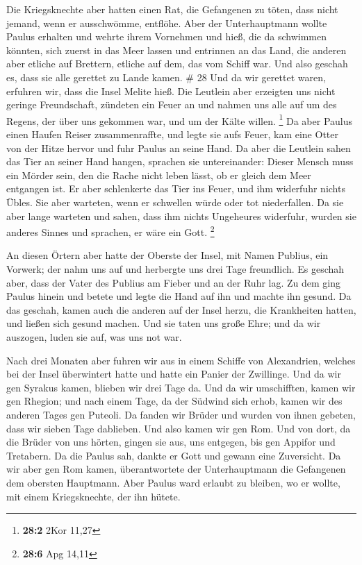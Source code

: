  Die Kriegsknechte aber hatten einen Rat, die Gefangenen zu
töten, dass nicht jemand, wenn er ausschwömme, entflöhe. 
Aber der Unterhauptmann wollte Paulus erhalten und wehrte ihrem
Vornehmen und hieß, die da schwimmen könnten, sich zuerst in das Meer
lassen und entrinnen an das Land,  die anderen aber etliche
auf Brettern, etliche auf dem, das vom Schiff war. Und also geschah es,
dass sie alle gerettet zu Lande kamen. \# 28  Und da wir
gerettet waren, erfuhren wir, dass die Insel Melite hieß. 
Die Leutlein aber erzeigten uns nicht geringe Freundschaft, zündeten ein
Feuer an und nahmen uns alle auf um des Regens, der über uns gekommen
war, und um der Kälte willen. \footnote{\textbf{28:2} 2Kor 11,27}
 Da aber Paulus einen Haufen Reiser zusammenraffte, und
legte sie aufs Feuer, kam eine Otter von der Hitze hervor und fuhr
Paulus an seine Hand.  Da aber die Leutlein sahen das Tier
an seiner Hand hangen, sprachen sie untereinander: Dieser Mensch muss
ein Mörder sein, den die Rache nicht leben lässt, ob er gleich dem Meer
entgangen ist.  Er aber schlenkerte das Tier ins Feuer, und
ihm widerfuhr nichts Übles.  Sie aber warteten, wenn er
schwellen würde oder tot niederfallen. Da sie aber lange warteten und
sahen, dass ihm nichts Ungeheures widerfuhr, wurden sie anderes Sinnes
und sprachen, er wäre ein Gott. \footnote{\textbf{28:6} Apg 14,11}

 An diesen Örtern aber hatte der Oberste der Insel, mit
Namen Publius, ein Vorwerk; der nahm uns auf und herbergte uns drei Tage
freundlich.  Es geschah aber, dass der Vater des Publius am
Fieber und an der Ruhr lag. Zu dem ging Paulus hinein und betete und
legte die Hand auf ihn und machte ihn gesund.  Da das
geschah, kamen auch die anderen auf der Insel herzu, die Krankheiten
hatten, und ließen sich gesund machen.  Und sie taten uns
große Ehre; und da wir auszogen, luden sie auf, was uns not war.

 Nach drei Monaten aber fuhren wir aus in einem Schiffe von
Alexandrien, welches bei der Insel überwintert hatte und hatte ein
Panier der Zwillinge.  Und da wir gen Syrakus kamen,
blieben wir drei Tage da.  Und da wir umschifften, kamen
wir gen Rhegion; und nach einem Tage, da der Südwind sich erhob, kamen
wir des anderen Tages gen Puteoli.  Da fanden wir Brüder
und wurden von ihnen gebeten, dass wir sieben Tage dablieben. Und also
kamen wir gen Rom.  Und von dort, da die Brüder von uns
hörten, gingen sie aus, uns entgegen, bis gen Appifor und Tretabern. Da
die Paulus sah, dankte er Gott und gewann eine Zuversicht. 
Da wir aber gen Rom kamen, überantwortete der Unterhauptmann die
Gefangenen dem obersten Hauptmann. Aber Paulus ward erlaubt zu bleiben,
wo er wollte, mit einem Kriegsknechte, der ihn hütete.

